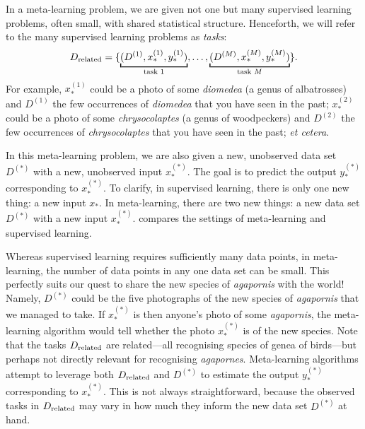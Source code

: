 \documentclass[12pt, twoside]{report}
\begin{document}
In a meta-learning problem, we are given not one but many supervised learning problems, often small, with shared statistical structure.
Henceforth, we will refer to the many supervised learning problems as \emph{tasks}:
\begin{equation} \label{eq:introduction:related_data}
    D\ss{related} = \set{
        \underbracket[1pt]{(D^{(1)}, x_{*}^{(1)}, y_{*}^{(1)})}_{\text{task $1$}},
        \ldots,
        \underbracket[1pt]{(D^{(M)},x_*^{(M)}, y_{*}^{(M)})}_{\text{task $M$}}
    }.
\end{equation}
For example, $\displaystyle x^{(1)}_*$ could be a photo of some \emph{diomedea} (a genus of albatrosses) and $D^{(1)}$ the few occurrences of \emph{diomedea} that you have seen in the past;
$\displaystyle x^{(2)}_*$ could be a photo of some \emph{chrysocolaptes} (a genus of woodpeckers) and $D^{(2)}$ the few occurrences of \emph{chrysocolaptes} that you have seen in the past;
\textit{et cetera}.

In this meta-learning problem, we are also given a new, unobserved data set $D^{(*)}$ with a new, unobserved input $\displaystyle x_*^{(*)}$.
The goal is to predict the output $\displaystyle y^{(*)}_*$ corresponding to $\displaystyle x_*^{(*)}$.
To clarify, in supervised learning, there is only one new thing: a new input $x_*$.
In meta-learning, there are two new things: a new data set $D^{(*)}$ with a new input $\displaystyle x^{(*)}_*$.
 compares the settings of meta-learning and supervised learning.

Whereas supervised learning requires sufficiently many data points,
in meta-learning, the number of data points in any one data set can be small.
This perfectly suits our quest to share the new species of \emph{agapornis} with the world!
Namely, $D^{(*)}$ could be the five photographs of the new species of \emph{agapornis} that we managed to take.
If $\displaystyle x^{(*)}_{*}$ is then anyone's photo of some \emph{agapornis},
the meta-learning algorithm would tell whether the photo $\displaystyle x^{(*)}_*$ is of the new species.
Note that the tasks $D\ss{related}$ are related---all recognising species of genea of birds---but perhaps not directly relevant for recognising \emph{agapornes}.
Meta-learning algorithms attempt to leverage both $D\ss{related}$ and $D^{(*)}$ to estimate the output $\displaystyle y^{(*)}_*$ corresponding to $\displaystyle x^{(*)}_*$.
This is not always straightforward, because the observed tasks in $D\ss{related}$ may vary in how much they inform the new data set $D^{(*)}$ at hand.
\end{document}
